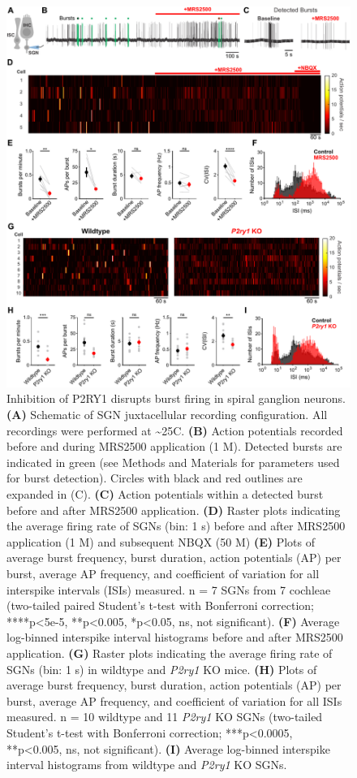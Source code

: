 \documentclass[9pt,lineno]{elife}
\begin{document}
\begin{figure}
\begin{fullwidth}
\includegraphics[width=.95\linewidth]{figures/Fig6.pdf}
\caption{Inhibition of P2RY1 disrupts burst firing in spiral ganglion neurons.
\textbf{(A)} Schematic of SGN juxtacellular recording configuration. All recordings were performed at \textasciitilde 25\textdegree C.
\textbf{(B)} Action potentials recorded before and during MRS2500 application (1 \textmu M). Detected bursts are indicated in green (see Methods and Materials for parameters used for burst detection). Circles with black and red outlines are expanded in (C).
\textbf{(C)} Action potentials within a detected burst before and after MRS2500 application.
\textbf{(D)} Raster plots indicating the average firing rate of SGNs (bin: 1 s) before and after MRS2500 application (1 \textmu M) and subsequent NBQX (50 \textmu M)
\textbf{(E)} Plots of average burst frequency, burst duration, action potentials (AP) per burst, average AP frequency, and coefficient of variation for all interspike intervals (ISIs) measured. n = 7 SGNs from 7 cochleae (two-tailed paired Student's t-test with Bonferroni correction; ****p<5e-5, **p<0.005, *p<0.05, ns, not significant).
\textbf{(F)} Average log-binned interspike interval histograms before and after MRS2500 application.
\textbf{(G)} Raster plots indicating the average firing rate of SGNs (bin: 1 s) in wildtype and \textit{P2ry1} KO mice. 
\textbf{(H)} Plots of average burst frequency, burst duration, action potentials (AP) per burst, average AP frequency, and coefficient of variation for all ISIs measured. n = 10 wildtype and 11 \textit{P2ry1} KO SGNs (two-tailed Student's t-test with Bonferroni correction; ***p<0.0005, **p<0.005, ns, not significant).
\textbf{(I)} Average log-binned interspike interval histograms from wildtype and \textit{P2ry1} KO SGNs.
}
\label{fig:f6}
\end{fullwidth}
\end{figure}
\end{document}
